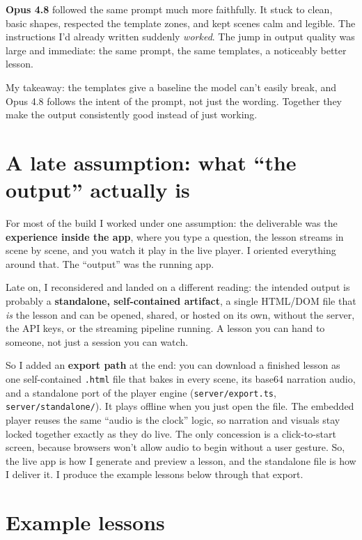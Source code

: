 \documentclass[11pt]{article}
\newcommand{\code}[1]{\texttt{#1}}
\begin{document}
\textbf{Opus 4.8} followed the same prompt much more faithfully. It stuck to clean,
basic shapes, respected the template zones, and kept scenes calm and legible. The
instructions I'd already written suddenly \emph{worked}. The jump in output quality was large and immediate: the same
prompt, the same templates, a noticeably better lesson.

My takeaway: the templates give a baseline the model can't easily break, and
Opus 4.8 follows the intent of the prompt, not just the wording. Together they
make the output consistently good instead of just working.
\hrulefill

\section*{A late assumption: what ``the output'' actually is}

For most of the build I worked under one assumption: the deliverable was the
\textbf{experience inside the app}, where you type a question, the lesson streams in
scene by scene, and you watch it play in the live player. I oriented everything
around that. The ``output'' was the running app.

Late on, I reconsidered and landed on a different reading: the intended output is
probably a \textbf{standalone, self-contained artifact}, a single HTML/DOM file that
\emph{is} the lesson and can be opened, shared, or hosted on its own, without the
server, the API keys, or the streaming pipeline running. A lesson you can hand to
someone, not just a session you can watch.

So I added an \textbf{export path} at the end: you can download a finished lesson as
one self-contained \code{.html} file that bakes in every scene, its base64 narration
audio, and a standalone port of the player engine (\code{server/export.ts},
\code{server/standalone/}). It plays offline when you just open the file. The embedded player reuses the same ``audio is the clock''
logic, so narration and visuals stay locked together exactly as they do live. The
only concession is a click-to-start screen, because browsers won't allow audio to
begin without a user gesture. So, the live app
is how I generate and preview a lesson, and the standalone file is how I deliver
it. I produce the example lessons below through that export.

\hrulefill

\section*{Example lessons}
\end{document}
